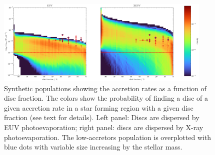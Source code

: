 \documentclass[fleqn,usenatbib,letters]{mnras}
\begin{document}
\begin{figure}
    \includegraphics[width=0.92\textwidth]{mdot_frac_comparison}
    \caption{Synthetic populations showing the accretion rates as a function of disc fraction. The colors show the probability of finding a disc of a given accretion rate in a star forming region with a given disc fraction (see text for details). Left panel: Discs are dispersed by EUV photoevaporation; right panel: discs are dispersed by X-ray photoevaporation. The low-accretors population is overplotted with blue dots with variable size increasing by the stellar mass.
    \label{fig:mdot_frac}}
\end{figure}
\end{document}
